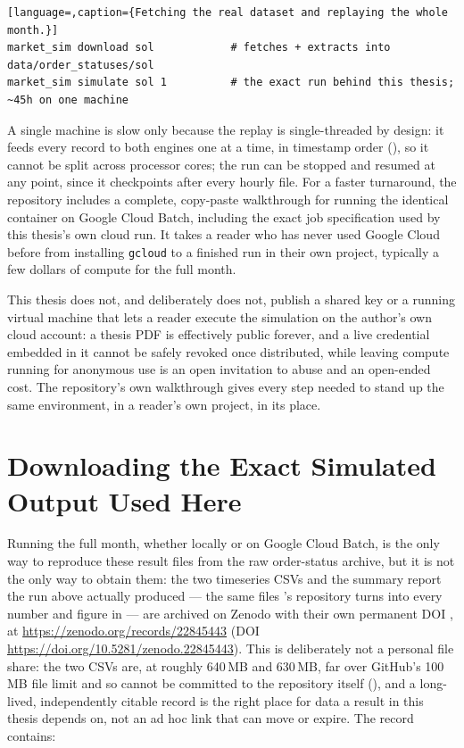 \begin{lstlisting}[language=,caption={Fetching the real dataset and replaying the whole month.}]
market_sim download sol            # fetches + extracts into data/order_statuses/sol
market_sim simulate sol 1          # the exact run behind this thesis; ~45h on one machine
\end{lstlisting}

A single machine is slow only because the replay is single-threaded by design:
it feeds every record to both engines one at a time, in timestamp order
(), so it cannot be split across processor cores; the run can be stopped and resumed at any point, since
it checkpoints after every hourly file. For a faster
turnaround, the repository includes a complete, copy-paste walkthrough for
running the identical container on Google Cloud Batch, including the exact
job specification used by this thesis's own cloud run. It takes a reader who
has never used Google Cloud before from
installing \texttt{gcloud} to a finished run in their own project, typically
a few dollars of compute for the full month.

This thesis does not, and deliberately does not, publish a shared key or a
running virtual machine that lets a reader execute the simulation on the
author's own cloud account: a thesis PDF is effectively public forever, and a
live credential embedded in it cannot be safely revoked once distributed, while
leaving compute running for anonymous use is an open invitation to abuse and an
open-ended cost. The repository's own walkthrough gives every step needed to
stand up the same environment, in a reader's own project, in its place.

\section{Downloading the Exact Simulated Output Used Here}
\label{sec:repro_output}

Running the full month, whether locally or on Google Cloud Batch, is the only
way to reproduce these result files from the raw order-status archive, but it
is not the only way to obtain them: the two timeseries CSVs and the summary
report the run above actually produced --- the same files
's repository turns into every number and figure in
 --- are archived on Zenodo with their own permanent DOI
\citep{moral2026output}, at
\url{https://zenodo.org/records/22845443} (DOI
\url{https://doi.org/10.5281/zenodo.22845443}). This is deliberately not a
personal file share: the two CSVs are, at roughly 640\,MB and 630\,MB, far
over GitHub's 100\,MB file limit and so cannot be committed to the repository
itself (), and a long-lived, independently citable
record is the right place for data a result in this thesis depends on, not an
ad hoc link that can move or expire. The record contains:

